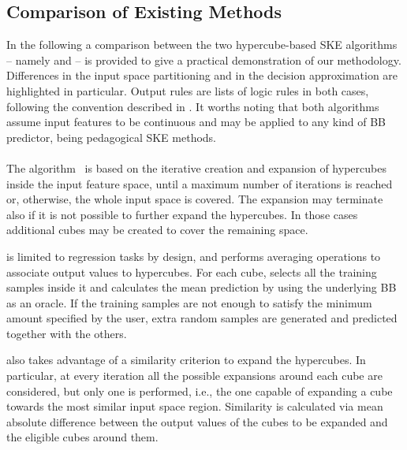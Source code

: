 \documentclass[
]{ceurart}
\begin{document}
\subsection{Comparison of Existing Methods}

In the following a comparison between the two hypercube-based SKE algorithms %
-- namely \iter{} and \gridex{} -- is provided to give a practical demonstration of our methodology.
%
Differences in the input space partitioning and in the decision approximation are highlighted in particular.
%
Output rules are lists of logic rules in both cases, following the convention described in .
%
It worths noting that both algorithms assume input features to be continuous and may be applied to any kind of BB predictor, being pedagogical SKE methods.

\paragraph{\iter}

The \iter{} algorithm~\cite{huysmans2006iter} is based on the iterative creation and expansion of hypercubes inside the input feature space, until a maximum number of iterations is reached or, otherwise, the whole input space is covered.
%
The expansion may terminate also if it is not possible to further expand the hypercubes.
%
In those cases additional cubes may be created to cover the remaining space.

\iter{} is limited to regression tasks by design, and performs averaging operations to associate output values to hypercubes.
%
For each cube, \iter{} selects all the training samples inside it and calculates the mean prediction by using the underlying BB as an oracle.
%
If the training samples are not enough to satisfy the minimum amount specified by the user, extra random samples are generated and predicted together with the others.

\iter{} also takes advantage of a similarity criterion to expand the hypercubes.
%
In particular, at every iteration all the possible expansions around each cube are considered, but only one is performed, i.e., the one capable of expanding a cube towards the most similar input space region.
%
Similarity is calculated via mean absolute difference between the output values of the cubes to be expanded and the eligible cubes around them.

\paragraph{\gridex{}}
\end{document}
